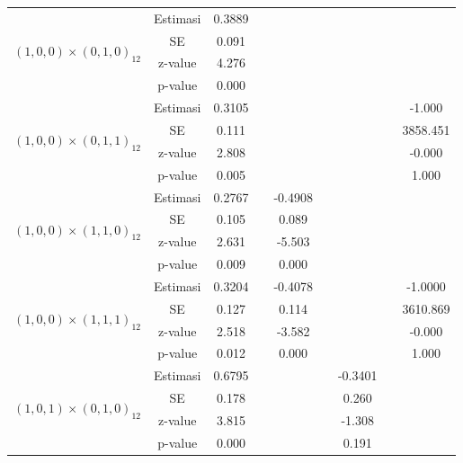 \begin{enumerate}[label=\alph*.]
\begin{longtable}{|c|c|c|c|c|c|c|c|c|}
            \multirow{4}{*}{$(1,0,0)\times(0,1,0)_{12}$}
            & Estimasi & 0.3889  & {} & {} & {} & {} & {} & {} \\ \cline{2-9}
            & SE       & 0.091  & {} & {} & {} & {} & {} & {} \\ \cline{2-9}
            & z-value  & 4.276   & {} & {} & {} & {} & {} & {}\\ \cline{2-9}
            & p-value  & 0.000 & {} & {} & {} & {} & {} & {} \\ \hline

            \multirow{4}{*}{$(1,0,0)\times(0,1,1)_{12}$}
            & Estimasi & 0.3105  & {} & {} & {} & {} & {} & -1.000 \\ \cline{2-9}
            & SE       & 0.111  & {} & {} & {} & {} & {} & 3858.451\\ \cline{2-9}
            & z-value  & 2.808   & {} & {} & {} & {} & {} & -0.000\\ \cline{2-9}
            & p-value  & 0.005 & {} & {} & {} & {} & {} & 1.000\\ \hline

            \multirow{4}{*}{$(1,0,0)\times(1,1,0)_{12}$}
            & Estimasi & 0.2767  & {} & -0.4908 & {} & {} & {} & {}\\ \cline{2-9}
            & SE       & 0.105  & {} & 0.089 & {} & {} & {} & {}\\ \cline{2-9}
            & z-value  & 2.631   & {} & -5.503 & {} & {} & {}& {}\\ \cline{2-9}
            & p-value  & 0.009 & {} & 0.000 & {} & {} & {} & {}\\ \hline

            \multirow{4}{*}{$(1,0,0)\times(1,1,1)_{12}$}
            & Estimasi & 0.3204  & {} & -0.4078 & {} & {} & {} & -1.0000 \\ \cline{2-9}
            & SE       & 0.127    & {} & 0.114 & {} & {} & {} & 3610.869\\ \cline{2-9}
            & z-value  & 2.518   & {} & -3.582 & {} & {} & {} & -0.000\\ \cline{2-9}
            & p-value  & 0.012    & {} &  0.000 & {} & {} & {} & 1.000\\ \hline

            \multirow{4}{*}{$(1,0,1)\times(0,1,0)_{12}$}
            & Estimasi & 0.6795  & {} & {} & {} & -0.3401 & {} & {}\\ \cline{2-9}
            & SE       & 0.178 & {} & {} & {} & 0.260 & {} & {}\\ \cline{2-9}
            & z-value  & 3.815   & {} & {} & {} & -1.308 & {}& {}\\ \cline{2-9}
            & p-value  & 0.000 & {} & {} & {} & 0.191 & {} & {}\\ \hline


\end{longtable}
\end{enumerate}
